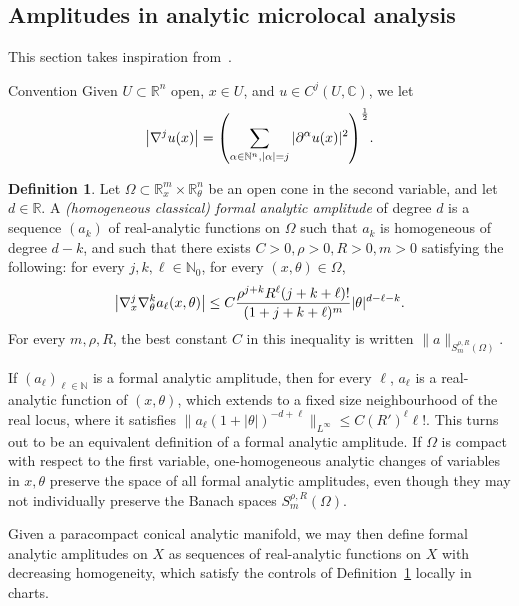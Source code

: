 \documentclass[10pt]{amsart}
\theoremstyle{definition}\newtheorem{defi}[theo]{Definition}\newtheorem{rema}[theo]{Remark}\newtheorem{exam}[theo]{Example}\newtheorem{exem}[theo]{Example}\newtheorem{nota}[theo]{Notation}
\newcommand\1{\mathds{1}}
\newcommand{\R}{\mathbb{R}}
\newcommand{\C}{\mathbb{C}}
\newcommand{\N}{\mathbb{N}}
\let\originalleft\left
\let\originalright\right
\renewcommand{\left}{\mathopen{}\mathclose\bgroup\originalleft}
\renewcommand{\right}{\aftergroup\egroup\originalright}
\begin{document}
\subsection{Amplitudes in analytic microlocal analysis}
\label{sec:ampl-analyt-micr}

This section takes inspiration from~\cite{deleporte_toeplitz_2018,sjostrand_singularites_1982,treves_analytic_2022}.



\begin{enonce*}{Convention}
Given $U\subset \R^n$ open, $x\in U$, and $u\in C^j(U,\C)$, we let
\[
\left|\nabla^ju(x)\right|=\left(\sum_{\alpha\in
\N^n,|\alpha|=j}|\partial^{\alpha}u(x)|^2\right)^{\frac 12}.
\]
\end{enonce*}

\begin{defi}\label{def:formal-amp}
Let $\Omega\subset \R^m_x\times \R^n_{\theta}$ be an open cone in the second variable, and let $d\in \R$. A \emph{(homogeneous classical) formal analytic amplitude} of degree $d$ is a sequence $(a_k)$ of real-analytic functions on $\Omega$ such that $a_k$ is homogeneous of degree $d-k$, and such that there exists $C>0, \rho>0,R>0,m>0$ satisfying the following: for every $j,k,\ell\in \N_0$, for every $(x,\theta)\in \Omega$,
\[
\left|\nabla^{j}_x\nabla^{k}_{\theta}a_\ell(x,\theta)\right|\leq C\frac{\rho^{j+k}R^\ell(j+k+\ell)!}{(1+j+k+\ell)^m}|\theta|^{d-\ell-k}.
\]
For every $m,\rho,R$, the best constant $C$ in this inequality is written $\|a\|_{S^{\rho,R}_m(\Omega)}$.
\end{defi}

If $(a_{\ell})_{\ell\in \N}$ is a formal analytic amplitude, then for every $\ell$, $a_{\ell}$ is a real-analytic function of $(x,\theta)$, which extends to a fixed size neighbourhood of the real locus, where it satisfies $\|a_{\ell}(1+|\theta|)^{-d+\ell}\|_{L^{\infty}}\leq C(R')^{\ell}\ell!$. This turns out to be an equivalent definition of a formal analytic amplitude. If $\Omega$ is compact with respect to the first variable, one-homogeneous analytic changes of variables in $x,\theta$ preserve the space of all formal analytic amplitudes, even though they may not individually preserve the Banach spaces $S^{\rho,R}_m(\Omega)$.

Given a paracompact conical analytic manifold, we may then define formal analytic amplitudes on $X$ as sequences of real-analytic functions on $X$ with decreasing homogeneity, which satisfy the controls of Definition~\ref{def:formal-amp} locally in charts.
\end{document}
